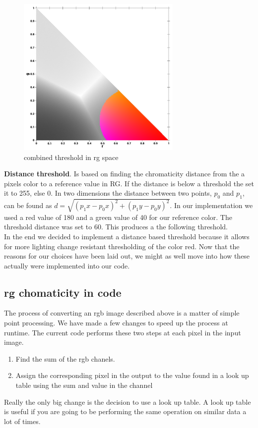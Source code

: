 \begin{multicols}{2}
\begin{figure}[H]
		\includegraphics[width=1\linewidth]{figure/Analysis/thresholdcolor.png}
		\caption{combined threshold in rg space}
	\end{figure}
	
\end{multicols}
\textbf{Distance threshold}. Is based on finding the chromaticity distance from the a pixels color to a reference value in RG. If the distance is below a threshold the set it to 255, else 0. In two dimensions the distance between two points, $p_0$ and $p_1$, can be found as $d = \sqrt{(p_1x - p_0x)^2 +(p_1y - p_0y)^2}$. In our implementation we used a red value of 180 and a green value of 40 for our reference color. The threshold distance was set to 60. This produces a the following threshold.\\
In the end we decided to implement a distance based threshold because it allows for more lighting change resistant thresholding of the color red. Now that the reasons for our choices have been laid out, we might as well move into how these actually were implemented into our code.
\subsection{rg chomaticity in code}
The process of converting an rgb image described above is a matter of simple point processing. We have made a few changes to speed up the process at runtime. The current code performs these two steps at each pixel in the input image.\\
\begin{enumerate}
	\item Find the sum of the rgb chanels.
	\item Assign the corresponding pixel in the output to the value found in a look up table using the sum and value in the channel\\
\end{enumerate}
Really the only big change is the decision to use a look up table. A look up table is useful if you are going to be performing the same operation on similar data a lot of times. 
